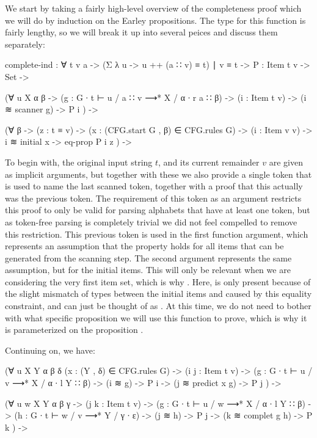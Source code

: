 		We start by taking a fairly high-level overview of the completeness
		proof which we will do by induction on the Earley propositions. The
		type for this function is fairly lengthy, so we will break it up into
		several peices and discuss them separately:

		\begin{code}
			complete-ind : ∀ {t v a} ->
			  (Σ λ u -> u ++ (a ∷ v) ≡ t) ∣ v ≡ t ->
			  {P : Item t v -> Set} ->

			  (∀ {u X α β} ->
			    (g : G ∙ t ⊢ u / a ∷ v ⟶* X / α ∙ r a ∷ β) ->
			    (i : Item t v) -> (i ≋ scanner g) ->
			    P i
			  ) ->

			  (∀ {β} ->
			    (z : t ≡ v) ->
			    (x : (CFG.start G , β) ∈ CFG.rules G) ->
			    (i : Item v v) ->
			    i ≋ initial x -> eq-prop P i z
			  ) ->
		\end{code}

		To begin with, the original input string $t$, and its current remainder
		$v$ are given as implicit arguments, but together with these we also
		provide a single token that is used to name the last scanned token,
		together with a proof that this actually was the previous token.  The
		requirement of this token as an argument restricts this proof to only
		be valid for parsing alphabets that have at least one token, but as
		token-free parsing is completely trivial we did not feel compelled to
		remove this restriction. This previous token is used in the first
		function argument, which represents an assumption that the property
		 holds for all items that can be generated from the scanning
		step. The second argument represents the same assumption, but for the
		initial items. This will only be relevant when we are considering the
		very first item set, which is why . Here,
		 is only present because of the slight mismatch of
		types between the initial items and  caused by this equality
		constraint, and can just be thought of as . At this time,
		we do not need to bother with what specific proposition we will use
		this function to prove, which is why it is parameterized on the
		proposition .

		Continuing on, we have:

		\begin{code}
			  (∀ {u X Y α β δ} (x : (Y , δ) ∈ CFG.rules G) ->
			    (i j : Item t v) ->
			    (g : G ∙ t ⊢ u / v ⟶* X / α ∙ l Y ∷ β) ->
			    (i ≋ g) -> P i ->
			    (j ≋ predict x g) -> P j
			  ) ->

			  (∀ {u w X Y α β γ} ->
			    (j k : Item t v) ->
			    (g : G ∙ t ⊢ u / w ⟶* X / α ∙ l Y ∷ β) ->
			    (h : G ∙ t ⊢ w / v ⟶* Y / γ ∙ ε) ->
			    (j ≋ h) -> P j ->
			    (k ≋ complet g h) -> P k
			  ) ->
		\end{code}

